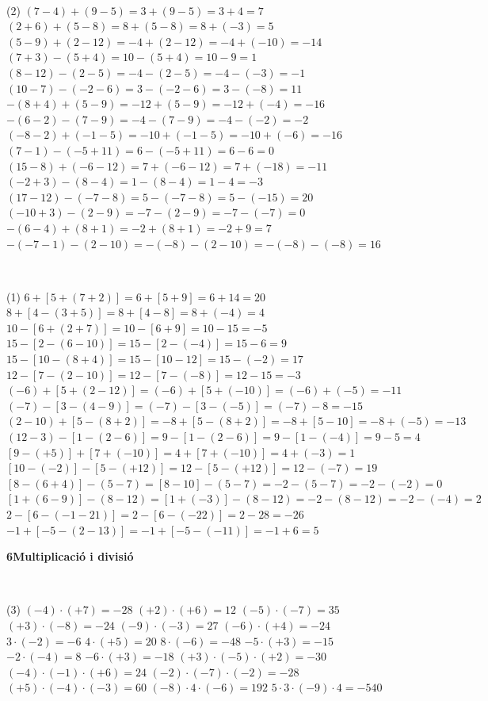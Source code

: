\documentclass[11pt,a4paper]{article}
\newcommand{\estrelles}[1]{{\color{accent}\ifcase#1\or\faStar\faStar[regular]\faStar[regular]\or\faStar\faStar\faStar[regular]\or\faStar\faStar\faStar\fi}}
\newcounter{exer}
\newcommand{\ex}[1]{\par\needspace{4\baselineskip}\medskip\stepcounter{exer}\noindent{\color{navy}\bfseries\theexer.}\ \ {\small\estrelles{#1}}\ \ }
\newcommand{\seccio}[2]{\par\needspace{10\baselineskip}\bigskip
  \begin{tcolorbox}[colback=navy,colframe=navy,coltext=white,arc=2mm,boxrule=0pt,left=3mm,right=3mm,top=1.2mm,bottom=1.2mm]
  {\large\bfseries #1\quad #2}
  \end{tcolorbox}\vspace{-2pt}}
\newcommand{\res}[1]{\boxed{#1}}
\begin{document}
\ex{2} \begin{tasks}(2)
  \task $(7-4)+(9-5)=3+(9-5)=3+4=\res{7}$
  \task $(2+6)+(5-8)=8+(5-8)=8+(-3)=\res{5}$
  \task $(5-9)+(2-12)=-4+(2-12)=-4+(-10)=\res{-14}$
  \task $(7+3)-(5+4)=10-(5+4)=10-9=\res{1}$
  \task $(8-12)-(2-5)=-4-(2-5)=-4-(-3)=\res{-1}$
  \task $(10-7)-(-2-6)=3-(-2-6)=3-(-8)=\res{11}$
  \task $-(8+4)+(5-9)=-12+(5-9)=-12+(-4)=\res{-16}$
  \task $-(6-2)-(7-9)=-4-(7-9)=-4-(-2)=\res{-2}$
  \task $(-8-2)+(-1-5)=-10+(-1-5)=-10+(-6)=\res{-16}$
  \task $(7-1)-(-5+11)=6-(-5+11)=6-6=\res{0}$
  \task $(15-8)+(-6-12)=7+(-6-12)=7+(-18)=\res{-11}$
  \task $(-2+3)-(8-4)=1-(8-4)=1-4=\res{-3}$
  \task $(17-12)-(-7-8)=5-(-7-8)=5-(-15)=\res{20}$
  \task $(-10+3)-(2-9)=-7-(2-9)=-7-(-7)=\res{0}$
  \task $-(6-4)+(8+1)=-2+(8+1)=-2+9=\res{7}$
  \task $-(-7-1)-(2-10)=-(-8)-(2-10)=-(-8)-(-8)=\res{16}$
\end{tasks}

\ex{3} \begin{tasks}(1)
  \task $6+[5+(7+2)]=6+[5+9]=6+14=\res{20}$
  \task $8+[4-(3+5)]=8+[4-8]=8+(-4)=\res{4}$
  \task $10-[6+(2+7)]=10-[6+9]=10-15=\res{-5}$
  \task $15-[2-(6-10)]=15-[2-(-4)]=15-6=\res{9}$
  \task $15-[10-(8+4)]=15-[10-12]=15-(-2)=\res{17}$
  \task $12-[7-(2-10)]=12-[7-(-8)]=12-15=\res{-3}$
  \task $(-6)+[5+(2-12)]=(-6)+[5+(-10)]=(-6)+(-5)=\res{-11}$
  \task $(-7)-[3-(4-9)]=(-7)-[3-(-5)]=(-7)-8=\res{-15}$
  \task $(2-10)+[5-(8+2)]=-8+[5-(8+2)]=-8+[5-10]=-8+(-5)=\res{-13}$
  \task $(12-3)-[1-(2-6)]=9-[1-(2-6)]=9-[1-(-4)]=9-5=\res{4}$
  \task $[9-(+5)]+[7+(-10)]=4+[7+(-10)]=4+(-3)=\res{1}$
  \task $[10-(-2)]-[5-(+12)]=12-[5-(+12)]=12-(-7)=\res{19}$
  \task $[8-(6+4)]-(5-7)=[8-10]-(5-7)=-2-(5-7)=-2-(-2)=\res{0}$
  \task $[1+(6-9)]-(8-12)=[1+(-3)]-(8-12)=-2-(8-12)=-2-(-4)=\res{2}$
  \task $2-[6-(-1-21)]=2-[6-(-22)]=2-28=\res{-26}$
  \task $-1+[-5-(2-13)]=-1+[-5-(-11)]=-1+6=\res{5}$
\end{tasks}


\seccio{6}{Multiplicació i divisió}

\ex{1} \begin{tasks}(3)
  \task $(-4)\cdot (+7)=\res{-28}$
  \task $(+2)\cdot (+6)=\res{12}$
  \task $(-5)\cdot (-7)=\res{35}$
  \task $(+3)\cdot (-8)=\res{-24}$
  \task $(-9)\cdot (-3)=\res{27}$
  \task $(-6)\cdot (+4)=\res{-24}$
  \task $3\cdot (-2)=\res{-6}$
  \task $4\cdot (+5)=\res{20}$
  \task $8\cdot (-6)=\res{-48}$
  \task $-5\cdot (+3)=\res{-15}$
  \task $-2\cdot (-4)=\res{8}$
  \task $-6\cdot (+3)=\res{-18}$
  \task $(+3)\cdot (-5)\cdot (+2)=\res{-30}$
  \task $(-4)\cdot (-1)\cdot (+6)=\res{24}$
  \task $(-2)\cdot (-7)\cdot (-2)=\res{-28}$
  \task $(+5)\cdot (-4)\cdot (-3)=\res{60}$
  \task $(-8)\cdot 4\cdot (-6)=\res{192}$
  \task $5\cdot 3\cdot (-9)\cdot 4=\res{-540}$
\end{tasks}
\end{document}
